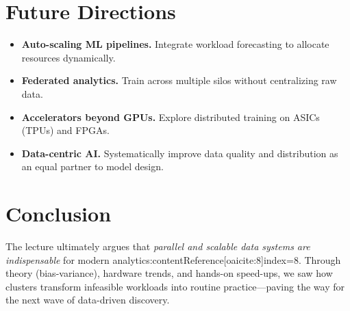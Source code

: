 \documentclass[11pt]{article}
\begin{document}
\section{Future Directions}

\begin{itemize}[itemsep=0pt]
  \item \textbf{Auto-scaling ML pipelines.} Integrate workload forecasting to allocate resources dynamically.
  \item \textbf{Federated analytics.} Train across multiple silos without centralizing raw data.
  \item \textbf{Accelerators beyond GPUs.} Explore distributed training on ASICs (TPUs) and FPGAs.
  \item \textbf{Data-centric AI.} Systematically improve data quality and distribution as an equal partner to model design.
\end{itemize}

\section*{Conclusion}

The lecture ultimately argues that \emph{parallel and scalable data systems are indispensable} for modern analytics:contentReference[oaicite:8]{index=8}.  
Through theory (bias-variance), hardware trends, and hands-on speed-ups, we saw how clusters transform infeasible workloads into routine practice—paving the way for the next wave of data-driven discovery.
\end{document}
